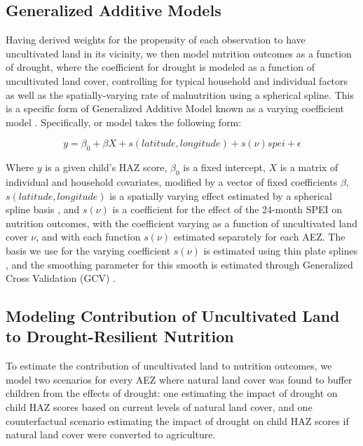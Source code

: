 \documentclass{article}
\begin{document}
\subsection{Generalized Additive Models}
Having derived weights for the propensity of each observation to have uncultivated land in its vicinity, we then model nutrition outcomes as a function of drought, where the coefficient for drought is modeled as a function of uncultivated land cover, controlling for typical household and individual factors as well as the spatially-varying rate of malnutrition using a spherical spline.  This is a specific form of Generalized Additive Model \cite{Hastie1986} known as a varying coefficient model \cite{Wood2017}.  Specifically, or model takes the following form:

\begin{equation}
 y = \beta_0 + \beta X + s(latitude, longitude) + s(\nu) spei + \epsilon \label{eqn:GAM}
\end{equation}

Where $y$ is a given child's HAZ score, $\beta_0$ is a fixed intercept, $X$ is a matrix of individual and household covariates, modified by a vector of fixed coefficients $\beta$, $s(latitude, longitude)$ is a spatially varying effect estimated by a spherical spline basis \cite{Wahba1982}, and $s(\nu)$ is a coefficient for the effect of the 24-month SPEI on nutrition outcomes, with the coefficient varying as a function of uncultivated land cover $\nu$, and with each function $s(\nu)$ estimated separately for each AEZ.  The basis we use for the varying coefficient $s(\nu)$ is estimated using thin plate splines \cite{Duchon1977}, and the smoothing parameter for this smooth is estimated through Generalized Cross Validation (GCV) \cite{Wood2017}.

\subsection{Modeling Contribution of Uncultivated Land to Drought-Resilient Nutrition}
To estimate the contribution of uncultivated land to nutrition outcomes, we model two scenarios for every AEZ where natural land cover was found to buffer children from the effects of drought: one estimating the impact of drought on child HAZ scores based on current levels of natural land cover, and one counterfactual scenario estimating the impact of drought on child HAZ scores if natural land cover were converted to agriculture.
\end{document}
